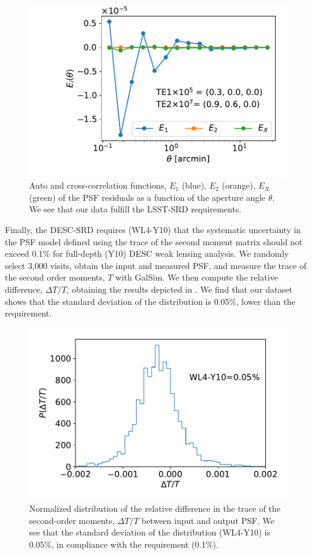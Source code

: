 \documentclass[\docopts]{\docclass}
\begin{document}
\begin{figure}
\centering
\includegraphics[width=0.85\columnwidth]{TEx}
\caption{Auto and cross-correlation functions, $E_{1}$ (blue), $E_{2}$ (orange), $E_{X}$ (green) of the PSF residuals as a function of the aperture angle $\theta$. We see that our data fulfill the LSST-SRD requirements.}
\label{fig:TEx}
\end{figure}

Finally, the DESC-SRD requires (WL4-Y10) that the systematic uncertainty in the PSF model defined using the trace of the second moment matrix should not exceed 0.1\% for full-depth (Y10) DESC weak lensing analysis. We randomly select 3,000 visits, obtain the input and measured PSF, and measure the trace of the second order moments, $T$ with GalSim. We then compute the relative difference, $\Delta T/T$, obtaining the results depicted in . We find that our dataset shows that the standard deviation of the distribution is 0.05\%, lower than the requirement.
\begin{figure}
\centering
\includegraphics[width=0.85\columnwidth]{WL4-Y10}
\caption{Normalized distribution of the relative difference in the trace of the second-order moments, $\Delta T/T$ between input and output PSF. We see that the standard deviation of the distribution (WL4-Y10) is 0.05\%, in compliance with the requirement (0.1\%).}
\label{fig:WL4-Y10}
\end{figure}
\end{document}
